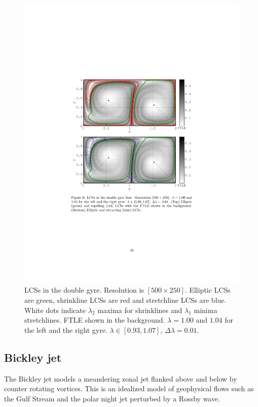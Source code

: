 \documentclass{elsarticle}
\begin{document}
\begin{figure}
\centering
\includegraphics[width=\textwidth]{graphics/double_gyre/lambda_hyperbolic_lcs}
\caption{
LCSs in the double gyre.
Resolution is $[500\times250]$.
Elliptic LCSs are green, shrinkline LCSs are red and stretchline LCSs are blue.
White dots indicate $\lambda_2$ maxima for shrinklines and $\lambda_1$ minima stretchlines.
FTLE shown in the background.
$\lambda = 1.00$ and $1.04$ for the left and the right gyre.
$\lambda \in [0.93,1.07]$, $\Delta\lambda = 0.01$.
}
\label{f:double gyre lambda hyperbolic LCS}
\end{figure}

\subsection{Bickley jet}

The Bickley jet models a meandering zonal jet flanked above and below by
counter rotating vortices. This is an idealized model of geophysical flows such as the Gulf Stream and the polar night jet perturbed by a Rossby wave\citep{castilloNegrete93:_chaot_rossb,beron-vera10:_invar_lagran}.
\end{document}
